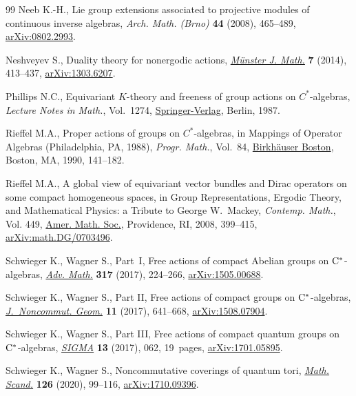 \documentclass[10pt,a4paper]{amsart}
\numberwithin{equation}{section}
\begin{document}
\begin{thebibliography}{99}
Neeb K.-H., Lie group extensions associated to projective modules of continuous
 inverse algebras, \textit{Arch. Math. (Brno)} \textbf{44} (2008), 465--489,
 \href{https://arxiv.org/abs/0802.2993}{arXiv:0802.2993}.

Neshveyev S., Duality theory for nonergodic actions, \href{https://doi.org/10.17879/58269764511}{\textit{M\"unster J.
 Math.}} \textbf{7} (2014), 413--437, \href{https://arxiv.org/abs/1303.6207}{arXiv:1303.6207}.

Phillips N.C., Equivariant {$K$}-theory and freeness of group actions on
 {$C^*$}-algebras, \textit{Lecture Notes in Math.}, Vol.~1274,
 \href{https://doi.org/10.1007/BFb0078657}{Springer-Verlag}, Berlin, 1987.

Rieffel M.A., Proper actions of groups on {$C^*$}-algebras, in Mappings of
 Operator Algebras ({P}hiladelphia, {PA}, 1988), \textit{Progr. Math.},
 Vol.~84, \href{https://doi.org/10.1007/978-1-4612-0453-4_6}{Birkh\"auser Boston}, Boston, MA, 1990, 141--182.

Rieffel M.A., A global view of equivariant vector bundles and {D}irac operators
 on some compact homogeneous spaces, in Group Representations, Ergodic Theory,
 and Mathematical Physics: a Tribute to {G}eorge {W}.~{M}ackey,
 \textit{Contemp. Math.}, Vol. 449, \href{https://doi.org/10.1090/conm/449/08721}{Amer. Math. Soc.}, Providence, RI, 2008,
 399--415, \href{https://arxiv.org/abs/math.DG/0703496}{arXiv:math.DG/0703496}.

Schwieger K., Wagner S., Part~{I}, {F}ree actions of compact {A}belian groups
 on {${\rm C}^*$}-algebras, \href{https://doi.org/10.1016/j.aim.2017.06.036}{\textit{Adv. Math.}} \textbf{317} (2017), 224--266,
 \href{https://arxiv.org/abs/1505.00688}{arXiv:1505.00688}.

Schwieger K., Wagner S., Part {II}, {F}ree actions of compact groups on {$\rm
 C^*$}-algebras, \href{https://doi.org/10.4171/JNCG/11-2-6}{\textit{J.~Noncommut. Geom.}} \textbf{11} (2017), 641--668,
 \href{https://arxiv.org/abs/#2}{arXiv:1508.07904}.

Schwieger K., Wagner S., Part {III}, {F}ree actions of compact quantum groups
 on {${\rm C}^*$}-algebras, \href{https://doi.org/10.3842/SIGMA.2017.062}{\textit{SIGMA}} \textbf{13} (2017), 062, 19~pages,
 \href{https://arxiv.org/abs/1701.05895}{arXiv:1701.05895}.

Schwieger K., Wagner S., Noncommutative coverings of quantum tori,
 \href{https://doi.org/10.7146/math.scand.a-116147}{\textit{Math. Scand.}} \textbf{126} (2020), 99--116, \href{https://arxiv.org/abs/1710.09396}{arXiv:1710.09396}.


\end{thebibliography}
\end{document}
